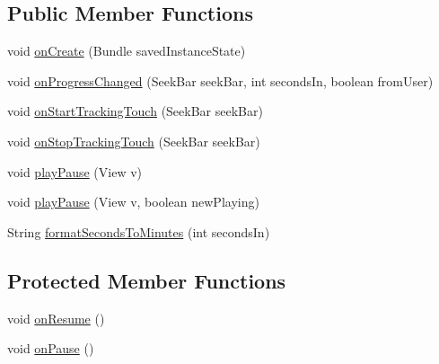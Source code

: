 \subsection*{Public Member Functions}
\begin{DoxyCompactItemize}
\item 
void \hyperlink{classcsc440_1_1nuf_1_1complay_1_1_player_activity_a592b9fe89b9076e65456181c0e389e3c}{on\-Create} (Bundle saved\-Instance\-State)
\item 
void \hyperlink{classcsc440_1_1nuf_1_1complay_1_1_player_activity_a0bf16e9f9a7c640c685def8eb7d38205}{on\-Progress\-Changed} (Seek\-Bar seek\-Bar, int seconds\-In, boolean from\-User)
\item 
void \hyperlink{classcsc440_1_1nuf_1_1complay_1_1_player_activity_a58c0167e7af40eb7747ed8ca90e1c939}{on\-Start\-Tracking\-Touch} (Seek\-Bar seek\-Bar)
\item 
void \hyperlink{classcsc440_1_1nuf_1_1complay_1_1_player_activity_a042e95babe17fab59ba7d71a6dfc9dbb}{on\-Stop\-Tracking\-Touch} (Seek\-Bar seek\-Bar)
\item 
void \hyperlink{classcsc440_1_1nuf_1_1complay_1_1_player_activity_aa3331f58e6bf08d6ccd6f324607738d8}{play\-Pause} (View v)
\item 
void \hyperlink{classcsc440_1_1nuf_1_1complay_1_1_player_activity_a7f5eb45ffac9b23a602a8ba76dbb6d47}{play\-Pause} (View v, boolean new\-Playing)
\item 
String \hyperlink{classcsc440_1_1nuf_1_1complay_1_1_player_activity_a2c26eb31e540ba1a1c22a029d1669741}{format\-Seconds\-To\-Minutes} (int seconds\-In)
\end{DoxyCompactItemize}
\subsection*{Protected Member Functions}
\begin{DoxyCompactItemize}
\item 
void \hyperlink{classcsc440_1_1nuf_1_1complay_1_1_player_activity_a9390d2b6a505e0a44fc421a8d146789e}{on\-Resume} ()
\item 
void \hyperlink{classcsc440_1_1nuf_1_1complay_1_1_player_activity_a3066e6fc9a59784f6ec3ddb23cc92707}{on\-Pause} ()
\end{DoxyCompactItemize}


